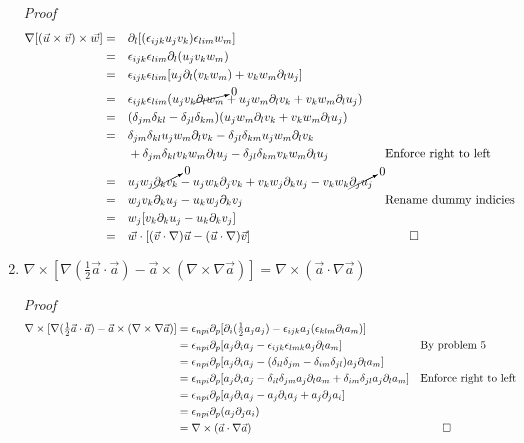 \documentclass[11pt,twoside]{article}
\renewcommand{\d}{\partial}
\newcommand{\vect}[1]{\vec{#1}}
\newcommand{\grad}{\nabla}
\newcommand{\cross}{\times}
\newcommand{\inline}[1]{\mbox{$#1$}}
\begin{document}
\begin{enumerate}
\textit{Proof}
\begin{align*}
\grad[(\vect{u}\cross\vect{v})\cross\vect{w}] 
            & = && \d_l[(\epsilon_{ijk}u_jv_k)\epsilon_{lim}w_m]\\
            & = && \epsilon_{ijk}\epsilon_{lim}\d_l(u_jv_kw_m)\\
            & = && \epsilon_{ijk}\epsilon_{lim}[u_j\d_l(v_kw_m)+v_kw_m\d_lu_j]\\
            & = && \epsilon_{ijk}\epsilon_{lim}(u_jv_k\cancelto{0}{\d_lw_m}+u_jw_m\d_lv_k+v_kw_m\d_lu_j)\\
            & = &&  (\delta_{jm}\delta_{kl}-\delta_{jl}\delta_{km})(u_jw_m\d_lv_k+v_kw_m\d_lu_j)\\
            & = && \delta_{jm}\delta_{kl}u_jw_m\d_lv_k-\delta_{jl}\delta_{km}u_jw_m\d_lv_k\\
            &   &&+ \delta_{jm}\delta_{kl}v_kw_m\d_lu_j-\delta_{jl}\delta_{km}v_kw_m\d_lu_j 
                && \text{Enforce right to left}\\
            & = && u_jw_j\cancelto{0}{\d_kv_k}-u_jw_k\d_jv_k+v_kw_j\d_ku_j-v_kw_k\cancelto{0}{\d_ju_j}\\
            & = && w_jv_k\d_ku_j-u_kw_j\d_kv_j && \text{Rename dummy indicies}\\
            & = && w_j[v_k\d_ku_j-u_k\d_kv_j]\\
            & = && \vect{w}\cdot[(\vect{v}\cdot\grad)\vect{u}-(\vect{u}\cdot\grad)\vect{v}] && \qed
\end{align*}


%
%
\item $\grad\cross[\grad(\inline{\frac{1}{2}}\vect{a}\cdot\vect{a})-\vect{a}\cross(\grad\cross\grad\vect{a})] = \grad\cross(\vect{a}\cdot\grad\vect{a})$

\textit{Proof}
\begin{align*}
\grad\cross[\grad(\inline{\frac{1}{2}}\vect{a}\cdot\vect{a})-\vect{a}\cross(\grad\cross\grad\vect{a})] 
   & = \epsilon_{npi}\d_p[\d_i(\inline{\frac{1}{2}}a_ja_j)-\epsilon_{ijk}a_j(\epsilon_{klm}\d_la_m)]\\
   & = \epsilon_{npi}\d_p[a_j\d_ia_j-\epsilon_{ijk}\epsilon_{lmk}a_j\d_la_m] && \text{By problem 5}\\
   & = \epsilon_{npi}\d_p[a_j\d_ia_j- (\delta_{il}\delta_{jm}-\delta_{im}\delta_{jl})a_j\d_la_m]\\
   & = \epsilon_{npi}\d_p[a_j\d_ia_j - \delta_{il}\delta_{jm}a_j\d_la_m+\delta_{im}\delta_{jl}a_j\d_la_m] && \text{Enforce right to left}\\
   & = \epsilon_{npi}\d_p[a_j\d_ia_j - a_j\d_ia_j + a_j\d_ja_i] \\
   & = \epsilon_{npi}\d_p(a_j\d_ja_i) \\
   & = \grad\cross(\vect{a}\cdot\grad\vect{a}) && \qed\\
\end{align*}




\end{enumerate}
\end{document}
